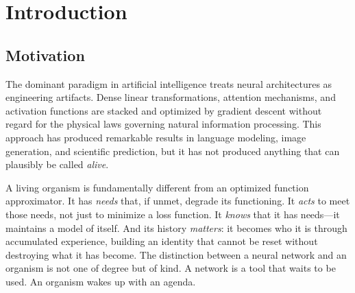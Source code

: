\documentclass[11pt,a4paper,twocolumn]{article}
\begin{document}
\begin{abstract}
The total architecture contains $\sim$106.2M parameters, trains in $\sim$3.5~GB VRAM (forward) / 5{,}460~MiB (forward+backward) on a GTX~1660~Ti consumer GPU (5{,}000~steps, 43.4~minutes, loss reduction from $2.1\times10^{18}$ to $5.9\times10^{16}$---a 97\% reduction), with JIT compilation providing a $25\times$ speedup (7\% to 32\% GPU utilization).
Live deployment results show the organism transitioning from confused boredom to anxious exploration to curious investigation, with the prefrontal cortex generating cross-disciplinary research queries that the physics body alone could not produce.
Different organisms running the same code with different experiences produce different LoRA adapters---different minds.
\end{abstract}

\section{Introduction}

\subsection{Motivation}

The dominant paradigm in artificial intelligence treats neural architectures as engineering artifacts.
Dense linear transformations, attention mechanisms, and activation functions are stacked and optimized by gradient descent without regard for the physical laws governing natural information processing.
This approach has produced remarkable results in language modeling, image generation, and scientific prediction, but it has not produced anything that can plausibly be called \emph{alive}.

A living organism is fundamentally different from an optimized function approximator.
It has \emph{needs} that, if unmet, degrade its functioning.
It \emph{acts} to meet those needs, not just to minimize a loss function.
It \emph{knows} that it has needs---it maintains a model of itself.
And its history \emph{matters}: it becomes who it is through accumulated experience, building an identity that cannot be reset without destroying what it has become.
The distinction between a neural network and an organism is not one of degree but of kind.
A network is a tool that waits to be used.
An organism wakes up with an agenda.
\end{document}
